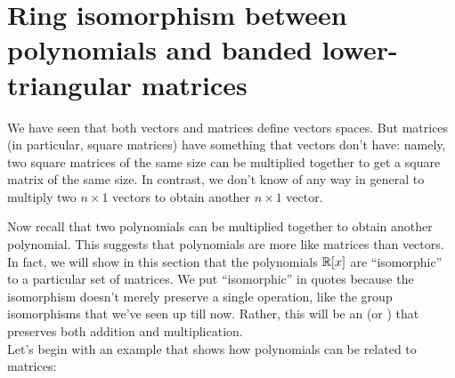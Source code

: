 \section{Ring isomorphism between polynomials and banded lower-triangular matrices}\label{sec:ringIsoPolyMat}

We have seen that both vectors and matrices define vectors spaces.  But matrices (in particular, square matrices) have something that vectors don't have: namely, two square matrices of the same size can be multiplied together to get a square matrix of the same size.  In contrast, we don't know of any way in general to multiply two $n \times 1$ vectors to obtain another $n \times 1$ vector. 

Now recall that two polynomials can be multiplied together to obtain another polynomial. This suggests that polynomials are more like matrices than vectors. In fact, we will show in this section that the polynomials $\mathbb{R}[x]$ are ``isomorphic'' to a particular set of matrices.  We put ``isomorphic'' in quotes because the isomorphism doesn't merely preserve a single operation, like the group isomorphisms  that we've seen up till now. Rather, this will be an  (or ) that preserves both addition and multiplication.\\
Let's begin with an example that shows how polynomials can be related to matrices:

